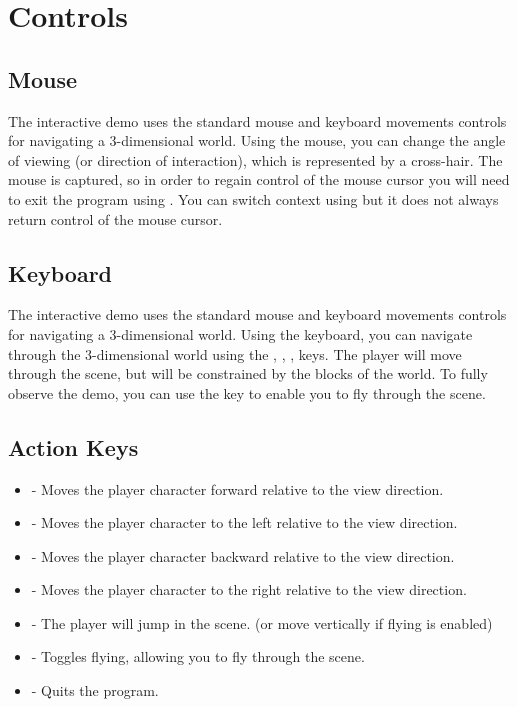 \documentclass[a4paper,11pt,titlepage]{scrartcl}
\begin{document}
\section{Controls}
\subsection{Mouse}
The interactive demo uses the standard mouse and keyboard movements controls for navigating a 3-dimensional world. Using the mouse, you can change the angle of viewing (or direction of interaction), which is represented by a cross-hair. The mouse is captured, so in order to regain control of the mouse cursor you will need to exit the program using . You can switch context using  but it does not always return control of the mouse cursor.

\subsection{Keyboard}
The interactive demo uses the standard mouse and keyboard movements controls for navigating a 3-dimensional world. Using the keyboard, you can navigate through the 3-dimensional world using the , , ,  keys. The player will move through the scene, but will be constrained by the blocks of the world. To fully observe the demo, you can use the  key to enable you to fly through the scene.

\subsection{Action Keys}
\begin{itemize}
	\item {} - Moves the player character forward relative to the view direction.
	\item {} - Moves the player character to the left relative to the view direction.
	\item {} - Moves the player character backward relative to the view direction.
	\item {} - Moves the player character to the right relative to the view direction.
	\item {} - The player will jump in the scene. (or move vertically if flying is enabled)
	\item {} - Toggles flying, allowing you to fly through the scene.
	\item {} - Quits the program.
\end{itemize}
      
\end{document}

